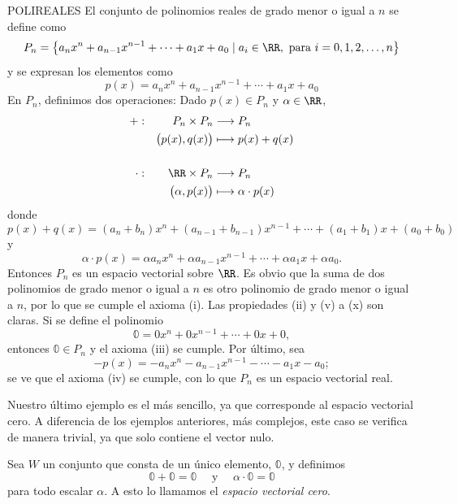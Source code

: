 \begin{examplebox}{}{POLIREALES}
    El conjunto de polinomios reales de grado menor o igual a $n$ se define como
    $$P_n = \left\{ a_nx^n + a_{n-1}x^{n-1} + \cdots + a_1x + a_0 \mid a_i \in \RR, \text{ para } i = 0, 1, 2, \dots, n \right\}$$
    y se expresan los elementos como
    $$p(x) = a_nx^n + a_{n-1}x^{n-1} + \cdots + a_1x + a_0$$
    En $P_n$, definimos dos operaciones: Dado $p(x) \in P_n$ y $\alpha \in \RR$,
    \begin{alignat*}{2}
        + & : & \quad P_n \times P_n & \longrightarrow P_n \\
        & & \big(p(x), q(x) \big) & \longmapsto p(x)+q(x) \\
        & \\
        \cdot & : & \quad \RR \times P_n & \longrightarrow P_n \\
        & & \big(\alpha, p(x) \big) & \longmapsto \alpha \cdot p(x)
    \end{alignat*}
    donde
    $$p(x) + q(x) = (a_n + b_n)x^n + (a_{n-1} + b_{n-1})x^{n-1} + \cdots + (a_1 + b_1)x + (a_0 + b_0)$$
    y
    $$\alpha \cdot p(x) = \alpha a_nx^n + \alpha a_{n-1}x^{n-1} + \cdots + \alpha a_1x + \alpha a_0.$$
    Entonces $P_n$ es un espacio vectorial sobre $\RR$. Es obvio que la suma de dos polinomios de grado menor o igual a $n$ es otro polinomio de grado menor o igual a $n$, por lo que se cumple el axioma (i). Las propiedades (ii) y (v) a (x) son claras. Si se define el polinomio
    $$\mathbb{0} = 0 x^n+0 x^{n-1} + \cdots + 0 x + 0,$$
    entonces $\mathbb{0} \in P_n$ y el axioma (iii) se cumple. Por último, sea
    $$-p(x) = -a_n x^n - a_{n-1} x^{n-1} - \cdots - a_1 x - a_0;$$
    se ve que el axioma (iv) se cumple, con lo que $P_n$ es un espacio vectorial real.
\end{examplebox}

Nuestro último ejemplo es el más sencillo, ya que corresponde al espacio vectorial cero. A diferencia de los ejemplos anteriores, más complejos, este caso se verifica de manera trivial, ya que solo contiene el vector nulo.

\begin{examplebox}{}{}
    Sea $W$ un conjunto que consta de un único elemento, $\mathbb{0}$, y definimos
    $$\mathbb{0} + \mathbb{0} = \mathbb{0} \quad \text{ y } \quad \alpha \cdot \mathbb{0} = \mathbb{0}$$
    para todo escalar $\alpha$. A esto lo llamamos el \emph{espacio vectorial cero}.
\end{examplebox}

